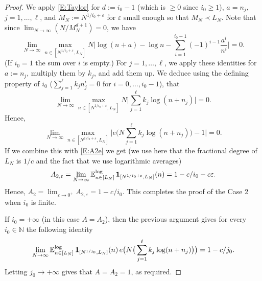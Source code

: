 \documentclass[11pt]{amsart}
\theoremstyle{definition}
\newcommand{\lE}{\mathbb{E}^{\log}}
\newcommand{\N}{{\mathbb N}}
\begin{document}
\begin{proof}
	
	We apply \eqref{E:Taylor}  for $d:=i_0-1$ (which is $\geq 0$ since $i_0\geq 1$),   $a=n_j$, $j=1,\ldots, \ell$, and $M_N:=N^{1/i_0+\varepsilon}$ for $\varepsilon$ small enough so that $M_N\prec L_N$. %
	Note that since
	$\lim_{N\to\infty} (N / M_N^{d+1})= 0$,   we have
	$$
	\lim_{N\to\infty} \max_{n \in [N^{1/i_0+\varepsilon},L_N]} 	N	\Big| \log(n+a)-\log n- \sum_{i=1}^{i_0-1} (-1)^{i-1} \frac{a^i} {n^i}\Big|=0.
	$$
	(If $i_0=1$ the sum over $i$ is empty.)
	For $j=1,\ldots, \ell$, we apply these identities for $a:=n_j$,  multiply  them by $k_j$, and add them up.  We deduce using the defining property of $i_0$
	($\sum_{j=1}^\ell k_j n_j^i=0$  for $i=0,\ldots,i_0-1$),    that
	$$
	\lim_{N\to\infty} \max_{n\in [N^{1/i_0+\varepsilon},L_N]} N	\Big| \sum_{j=1}^\ell k_j \log(n+n_j)\Big|= 0.
	$$
	Hence,
	$$
	\lim_{N\to\infty} \max_{n\in [N^{1/i_0+\varepsilon},L_N]} \Big|e\big(N \sum_{j=1}^\ell k_j \log(n+n_j)\big)-1\big|= 0.
	$$
If we combine this with \eqref{E:A2e} we get  (we use here that the fractional degree of $L_N$ is $1/c$ and the fact that we use logarithmic averages)
	$$
	A_{2,\varepsilon}=\lim_{N\to\infty}	\lE_{n\in[L_N]}\, {\bf 1}_{[N^{1/i_0+\varepsilon},L_N]} (n)=1-c/i_0-c \varepsilon.
	$$
	Hence,  $A_2=\lim_{\varepsilon\to 0^+} A_{2,\varepsilon}=1-c/i_0$. This completes the proof of the Case 2 when $i_0$ is finite.
	
	If $i_0=+\infty$ (in this case $A=A_2$), then the previous argument  gives for every $i_0\in \N$ the following identity
	$$
	\lim_{N\to\infty}	\lE_{n\in[L_N]}\, {\bf 1}_{[N^{1/j_0},L_N]} (n)\,  e\big(N\big(\sum_{j=1}^\ell k_j \log(n+n_j)\big)\big)=1-c/j_0.
	$$
 Letting $j_0\to +\infty$  gives that $A=A_2=1$, as required.
\end{proof}


	
\end{document}
